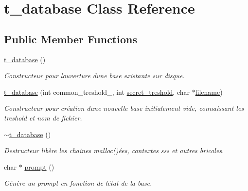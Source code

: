 \hypertarget{classt__database}{}\section{t\+\_\+database Class Reference}
\label{classt__database}
\subsection*{Public Member Functions}
\begin{DoxyCompactItemize}
\item 
\hyperlink{classt__database_a17ae86a03bc66df3fee4e1d0ce319a42}{t\+\_\+database} ()
\begin{DoxyCompactList}\small\item\em Constructeur pour l\textquotesingle{}ouverture d\textquotesingle{}une base existante sur disque. \end{DoxyCompactList}\item 
\hyperlink{classt__database_a3131dd266649fa3f285dc9bf743cd38c}{t\+\_\+database} (int common\+\_\+treshold\+\_\+, int \hyperlink{classt__database_a2cf0215c007666523cf17d9cbd3feab7}{secret\+\_\+treshold}, char $\ast$\hyperlink{classt__database_af184c26218d74306d669fa972b6b3a17}{filename})
\begin{DoxyCompactList}\small\item\em Constructeur pour création d\textquotesingle{}une nouvelle base initialement vide, connaissant les treshold et nom de fichier. \end{DoxyCompactList}\item 
\mbox{\label{classt__database_a21c54d100406d47c64e9006e8af99cd6}} 
\hyperlink{classt__database_a21c54d100406d47c64e9006e8af99cd6}{$\sim$t\+\_\+database} ()
\begin{DoxyCompactList}\small\item\em Destructeur libère les chaines malloc()ées, contextes sss et autres bricoles. \end{DoxyCompactList}\item 
char $\ast$ \hyperlink{classt__database_ad8a52cfc74f60fa35aa81078388e3d4f}{prompt} ()
\begin{DoxyCompactList}\small\item\em Génère un prompt en fonction de l\textquotesingle{}état de la base. \end{DoxyCompactList}\item 
\mbox{\label{classt__database_ae4a3285f4b6fcb0c0dc6eda6e19d24f6}} 

\end{DoxyCompactItemize}
